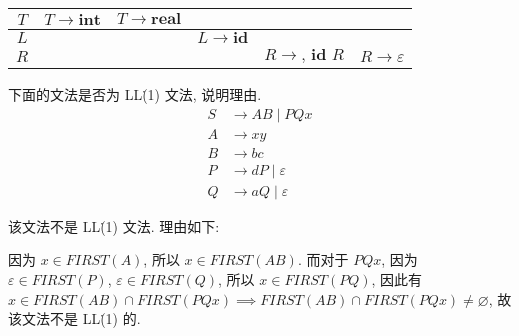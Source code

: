\documentclass[boxes]{homework}
\begin{document}
\begin{solution}
\begin{table}[ht]
\begin{tabular}{c|ccccc}
            $T$                       & \multicolumn{1}{c|}{$T \to \textbf{int}$} & \multicolumn{1}{c|}{$T \to \textbf{real}$} & \multicolumn{1}{c|}{}                    & \multicolumn{1}{c|}{}                         &                     \\ \hline
            $L$                       & \multicolumn{1}{c|}{}                     & \multicolumn{1}{c|}{}                      & \multicolumn{1}{c|}{$L \to \textbf{id}$} & \multicolumn{1}{c|}{}                         &                     \\ \hline
            $R$                       & \multicolumn{1}{c|}{}                     & \multicolumn{1}{c|}{}                      & \multicolumn{1}{c|}{}                    & \multicolumn{1}{c|}{$R \to \textbf{, id } R$} & $R \to \varepsilon$ \\ \hline
        \end{tabular}
    \end{table}
\end{solution}

\begin{problem}
下面的文法是否为 LL\.(1) 文法, 说明理由.
\begin{equation}
    \begin{aligned}
        S & \to AB \mid PQx         \\
        A & \to xy                  \\
        B & \to bc                  \\
        P & \to dP \mid \varepsilon \\
        Q & \to aQ \mid \varepsilon
    \end{aligned}
\end{equation}
\end{problem}
\begin{solution}
    该文法不是 LL\.(1) 文法. 理由如下:

    因为 $x\in FIRST(A)$, 所以 $x\in FIRST(AB)$. 而对于 $PQx$, 因为
    $\varepsilon\in FIRST(P)$, $\varepsilon\in FIRST(Q)$, 所以 $x\in FIRST(PQ)$,
    因此有 $x\in FIRST(AB) \cap FIRST(PQx) \implies FIRST(AB) \cap FIRST(PQx)
        \neq \varnothing$, 故该文法不是 LL\.(1) 的.
\end{solution}
\end{document}
